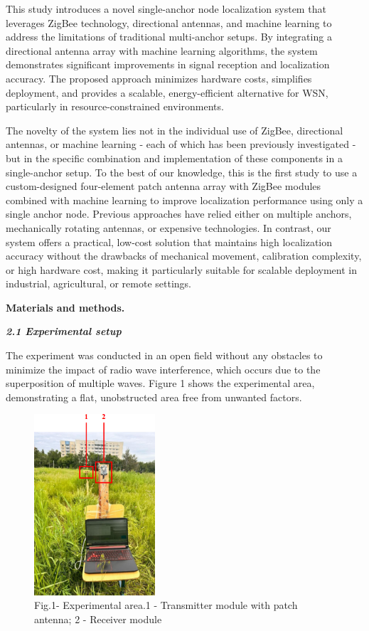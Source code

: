\begin{multicols}{2}
This study introduces a novel single-anchor node localization system
that leverages ZigBee technology, directional antennas, and machine
learning to address the limitations of traditional multi-anchor setups.
By integrating a directional antenna array with machine learning
algorithms, the system demonstrates significant improvements in signal
reception and localization accuracy. The proposed approach minimizes
hardware costs, simplifies deployment, and provides a scalable,
energy-efficient alternative for WSN, particularly in
resource-constrained environments.

The novelty of the system lies not in the individual use of ZigBee,
directional antennas, or machine learning - each of which has been
previously investigated - but in the specific combination and
implementation of these components in a single-anchor setup. To the best
of our knowledge, this is the first study to use a custom-designed
four-element patch antenna array with ZigBee modules combined with
machine learning to improve localization performance using only a single
anchor node. Previous approaches have relied either on multiple anchors,
mechanically rotating antennas, or expensive technologies. In contrast,
our system offers a practical, low-cost solution that maintains high
localization accuracy without the drawbacks of mechanical movement,
calibration complexity, or high hardware cost, making it particularly
suitable for scalable deployment in industrial, agricultural, or remote
settings.

{\bfseries Materials and methods.}

\emph{{\bfseries 2.1 Experimental setup}}

The experiment was conducted in an open field without any obstacles to
minimize the impact of radio wave interference, which occurs due to the
superposition of multiple waves. Figure 1 shows the experimental area,
demonstrating a flat, unobstructed area free from unwanted factors.

\begin{figure}[H]
	\centering
	\includegraphics[width=0.4\textwidth]{media/ict/image41}
	\caption*{Fig.1- Experimental area.1 - Transmitter module with patch
antenna; 2 - Receiver module}
\end{figure}


\end{multicols}
